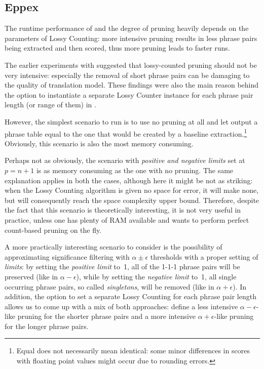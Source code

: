 \subsection{Eppex}

The runtime performance of \eppex{} and the degree of pruning heavily depends
on the parameters of Lossy Counting: more intensive pruning results in less phrase pairs
being extracted and then scored, thus more pruning leads to faster \eppex{} runs.

The earlier experiments with \eppex{} \citep{przywara:eppex} suggested that lossy-counted
pruning should not be very intensive: especially the removal of short phrase pairs can be
damaging to the quality of translation model.
These findings were also the main reason behind the option to instantiate a separate
Lossy Counter instance for each phrase pair length (or range of them) in \eppex{}.

However, the simplest scenario to run is to use no pruning at all and let \eppex{} output
a phrase table equal to the one that would be created by a baseline extraction.\footnote{Equal
does not necessarily mean identical: some minor differences in scores with floating point
values might occur due to rounding errors.}
Obviously, this scenario is also the most memory consuming.

Perhaps not as obviously, the scenario with \emph{positive and negative limits} set at
$p = n + 1$ is as memory consuming as the one with no pruning.
The same explanation applies in both the cases, although here it might be not as striking:
when the Lossy Counting algorithm is given no space for error, it will make none,
but will consequently reach the space complexity upper bound.
Therefore, despite the fact that this scenario is theoretically interesting, it is not very
useful in practice, unless one has plenty of RAM available and wants to perform perfect
count-based pruning on the fly.

A more practically interesting scenario to consider is the possibility of approximating
significance filtering with $\alpha \pm \epsilon$ thresholds with a proper setting of
\emph{limits}: by setting the \emph{positive limit} to~1, all of the 1-1-1 phrase pairs
will be preserved (like in $\alpha - \epsilon$), while by setting the \emph{negative limit} to~1,
all single occurring phrase pairs, so called \emph{singletons}, will be removed
(like in $\alpha + \epsilon$).
In addition, the option to set a separate Lossy Counting for each phrase pair length
allows us to come up with a mix of both approaches:
define a less intensive $\alpha - \epsilon$-like pruning for
the shorter phrase pairs and a more intensive $\alpha + \epsilon$-like pruning for the
longer phrase pairs.

